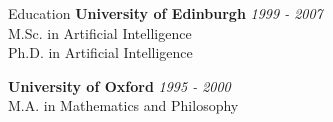 \documentclass{resume} %
\begin{document}

\begin{rSection}{Education}
{\bf University of Edinburgh} \hfill {\em 1999 - 2007} \\
M.Sc. in Artificial Intelligence\\ 
Ph.D. in Artificial Intelligence

{\bf University of Oxford} \hfill {\em 1995 - 2000} \\
M.A. in Mathematics and Philosophy\\
\end{rSection}

\end{document}
